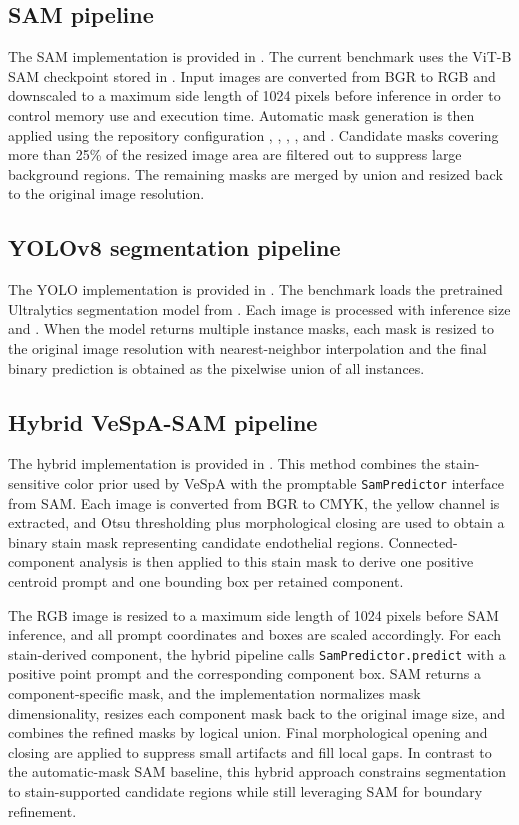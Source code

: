 \subsection{SAM pipeline}
The SAM implementation is provided in . The current benchmark uses the ViT-B SAM checkpoint stored in . Input images are converted from BGR to RGB and downscaled to a maximum side length of 1024 pixels before inference in order to control memory use and execution time. Automatic mask generation is then applied using the repository configuration , , , , and . Candidate masks covering more than 25\% of the resized image area are filtered out to suppress large background regions. The remaining masks are merged by union and resized back to the original image resolution.

\subsection{YOLOv8 segmentation pipeline}
The YOLO implementation is provided in . The benchmark loads the pretrained Ultralytics segmentation model from . Each image is processed with inference size  and . When the model returns multiple instance masks, each mask is resized to the original image resolution with nearest-neighbor interpolation and the final binary prediction is obtained as the pixelwise union of all instances.

\subsection{Hybrid VeSpA-SAM pipeline}
The hybrid implementation is provided in . This method combines the stain-sensitive color prior used by VeSpA with the promptable \texttt{SamPredictor} interface from SAM. Each image is converted from BGR to CMYK, the yellow channel is extracted, and Otsu thresholding plus morphological closing are used to obtain a binary stain mask representing candidate endothelial regions. Connected-component analysis is then applied to this stain mask to derive one positive centroid prompt and one bounding box per retained component.

The RGB image is resized to a maximum side length of 1024 pixels before SAM inference, and all prompt coordinates and boxes are scaled accordingly. For each stain-derived component, the hybrid pipeline calls \texttt{SamPredictor.predict} with a positive point prompt and the corresponding component box. SAM returns a component-specific mask, and the implementation normalizes mask dimensionality, resizes each component mask back to the original image size, and combines the refined masks by logical union. Final morphological opening and closing are applied to suppress small artifacts and fill local gaps. In contrast to the automatic-mask SAM baseline, this hybrid approach constrains segmentation to stain-supported candidate regions while still leveraging SAM for boundary refinement.

